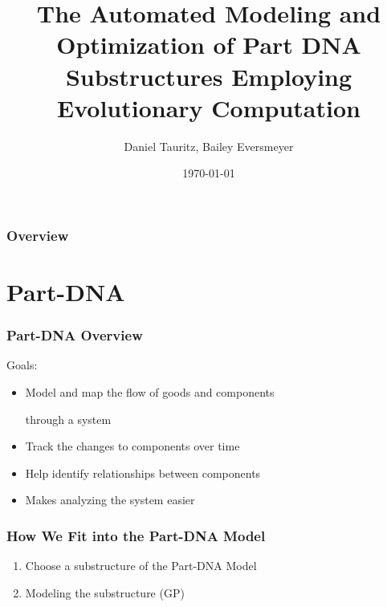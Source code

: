 \documentclass{beamer}
\title[Evolving Part-DNA Substructures]{The Automated Modeling and Optimization of Part DNA Substructures Employing Evolutionary Computation} %
\author{Daniel Tauritz, Bailey Eversmeyer} %
\institute[S\&T] %
{
Missouri University of Science and Technology \\ %
Department of Computer Science

\medskip
\textit{tauritzd@mst.edu, rbe62d@mst.edu} %
}
\date{\today} %
\begin{document}
\begin{frame}
\titlepage %
\end{frame}

\begin{frame}
\frametitle{Overview} %
\tableofcontents %
\end{frame}

\section{Part-DNA}

\begin{frame}
\frametitle{Part-DNA Overview}
Goals:
\begin{itemize}
\item Model and map the flow of goods and components

through a system\pause
\item Track the changes to components over time\pause
\item Help identify relationships between components\pause
\item Makes analyzing the system easier
\end{itemize}
\end{frame}

\begin{frame}
\frametitle{How We Fit into the Part-DNA Model}
\begin{enumerate}
\item Choose a substructure of the Part-DNA Model\pause
\item Modeling the substructure (GP)
\end{enumerate}
\end{frame}
\end{document}
